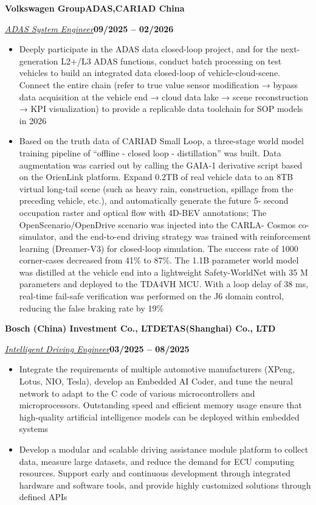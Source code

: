 \documentclass[10pt,a4paper]{article}
\newcommand{\entrycompany}[2]{%
  \par\vspace{0.80bp}\noindent\textbf{#1}\hfill\textbf{#2}\par\vspace{0.50bp}%
}
\let\jobcompany\entrycompany
\newcommand{\metaline}[2]{%
  \par\noindent\uline{\textit{#1}}\hfill\textbf{#2}\par\vspace{0.50bp}%
}
\let\roleline\metaline
\newenvironment{cvitems}{%
  \begin{itemize}[leftmargin=14.20bp,labelwidth=4.20bp,labelsep=10.00bp,align=left,
    topsep=0bp,itemsep=0bp,parsep=0bp,partopsep=0bp,label={\textbullet}]
}{\end{itemize}}
\begin{document}
\jobcompany{Volkswagen Group}{ADAS,CARIAD China}
\roleline{ADAS System Engineer}{09/2025 -- 02/2026}
\begin{cvitems}
\item Deeply participate in the ADAS data closed-loop project, and for the next-generation L2+/L3 ADAS functions, conduct batch processing on test vehicles to build an integrated data closed-loop of vehicle-cloud-scene. Connect the entire chain (refer to true value sensor modification → bypass data acquisition at the vehicle end → cloud data lake → scene reconstruction → KPI visualization) to provide a replicable data toolchain for SOP models in 2026
\item Based on the truth data of CARIAD Small Loop, a three-stage world model training pipeline of ``offline - closed loop - distillation'' was built. Data augmentation was carried out by calling the GAIA-1 derivative script based on the OrienLink platform. Expand 0.2TB of real vehicle data to an
8TB virtual long-tail scene (such as heavy rain, construction, spillage from the preceding vehicle, etc.), and automatically generate the future 5-\linebreak
second occupation raster and optical flow with 4D-BEV annotations; The OpenScenario/OpenDrive scenario was injected into the CARLA-\linebreak
Cosmos co-simulator, and the end-to-end driving strategy was trained with reinforcement learning (Dreamer-V3) for closed-loop simulation. The\linebreak
success rate of 1000 corner-cases decreased from 41\% to 87\%. The 1.1B parameter world model was distilled at the vehicle end into a lightweight\linebreak
Safety-WorldNet with 35 M parameters and deployed to the TDA4VH MCU. With a loop delay of 38 ms, real-time fail-safe verification was\linebreak
performed on the J6 domain control, reducing the false braking rate by 19\%
\end{cvitems}

\jobcompany{Bosch (China) Investment Co., LTD}{ETAS(Shanghai) Co., LTD}
\roleline{Intelligent Driving Engineer}{03/2025 -- 08/2025}
\begin{cvitems}
\item Integrate the requirements of multiple automotive manufacturers (XPeng, Lotus, NIO, Tesla), develop an Embedded AI Coder, and tune the neural network to adapt to the C code of various microcontrollers and microprocessors. Outstanding speed and efficient memory usage ensure that high-quality artificial intelligence models can be deployed within embedded systems
\item Develop a modular and scalable driving assistance module platform to collect data, measure large datasets, and reduce the demand for ECU computing resources. Support early and continuous development through integrated hardware and software tools, and provide highly customized solutions through defined APIs
\end{cvitems}
\end{document}
